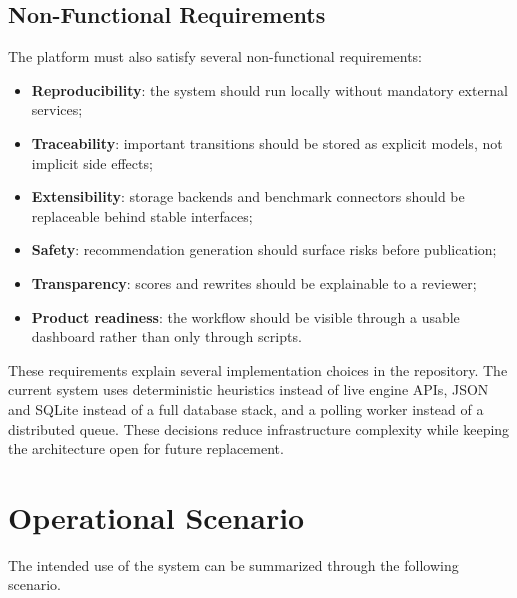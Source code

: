 \subsection{Non-Functional Requirements}

The platform must also satisfy several non-functional requirements:
\begin{itemize}
    \item \textbf{Reproducibility}: the system should run locally without mandatory external services;
    \item \textbf{Traceability}: important transitions should be stored as explicit models, not implicit side effects;
    \item \textbf{Extensibility}: storage backends and benchmark connectors should be replaceable behind stable interfaces;
    \item \textbf{Safety}: recommendation generation should surface risks before publication;
    \item \textbf{Transparency}: scores and rewrites should be explainable to a reviewer;
    \item \textbf{Product readiness}: the workflow should be visible through a usable dashboard rather than only through scripts.
\end{itemize}

These requirements explain several implementation choices in the repository. The current
system uses deterministic heuristics instead of live engine APIs, JSON and SQLite instead of a
full database stack, and a polling worker instead of a distributed queue. These decisions reduce
infrastructure complexity while keeping the architecture open for future replacement.

\section{Operational Scenario}

The intended use of the system can be summarized through the following scenario.

